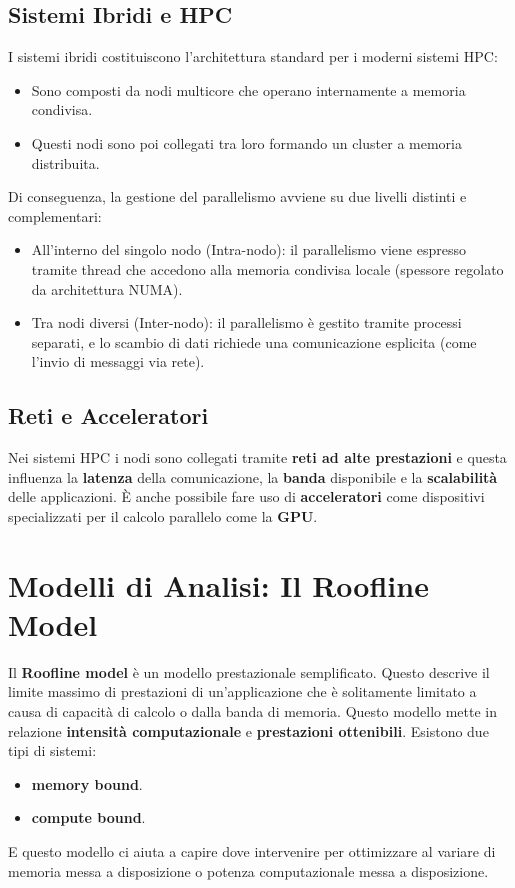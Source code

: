 \subsection{Sistemi Ibridi e HPC}
I sistemi ibridi costituiscono l'architettura standard per i moderni sistemi HPC:
\begin{itemize}
    \item Sono composti da nodi multicore che operano internamente a memoria condivisa.
    \item Questi nodi sono poi collegati tra loro formando un cluster a memoria distribuita.
\end{itemize}
Di conseguenza, la gestione del parallelismo avviene su due livelli distinti e complementari:
\begin{itemize}
    \item All'interno del singolo nodo (Intra-nodo): il parallelismo viene espresso tramite thread che accedono alla memoria condivisa locale (spessore regolato da architettura NUMA).
    \item Tra nodi diversi (Inter-nodo): il parallelismo è gestito tramite processi separati, e lo scambio di dati richiede una comunicazione esplicita (come l'invio di messaggi via rete).
\end{itemize}
\subsection{Reti e Acceleratori}
Nei sistemi HPC i nodi sono collegati tramite \textbf{reti ad alte prestazioni} e questa influenza la \textbf{latenza} della comunicazione, la \textbf{banda} disponibile e la \textbf{scalabilità} delle applicazioni. È anche possibile fare uso di \textbf{acceleratori} come dispositivi specializzati per il calcolo parallelo come la \textbf{GPU}.
\section{Modelli di Analisi: Il Roofline Model}
Il \textbf{Roofline model} è un modello prestazionale semplificato. Questo descrive il limite massimo di prestazioni di un'applicazione che è solitamente limitato a causa di capacità di calcolo o dalla banda di memoria. Questo modello mette in relazione \textbf{intensità computazionale} e \textbf{prestazioni ottenibili}. 
Esistono due tipi di sistemi:
\begin{itemize}
    \item \textbf{memory bound}.
    \item \textbf{compute bound}.
\end{itemize}
E questo modello ci aiuta a capire dove intervenire per ottimizzare al variare di memoria messa a disposizione o potenza computazionale messa a disposizione.

